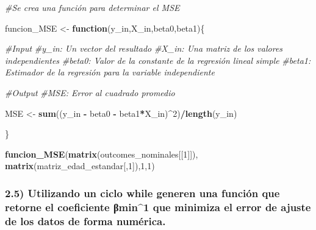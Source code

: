 \documentclass[
]{article}
\newenvironment{Shaded}{\begin{snugshade}}{\end{snugshade}}
\newcommand{\CommentTok}[1]{\textcolor[rgb]{0.56,0.35,0.01}{\textit{#1}}}
\newcommand{\ControlFlowTok}[1]{\textcolor[rgb]{0.13,0.29,0.53}{\textbf{#1}}}
\newcommand{\DecValTok}[1]{\textcolor[rgb]{0.00,0.00,0.81}{#1}}
\newcommand{\FunctionTok}[1]{\textcolor[rgb]{0.13,0.29,0.53}{\textbf{#1}}}
\newcommand{\NormalTok}[1]{#1}
\newcommand{\OtherTok}[1]{\textcolor[rgb]{0.56,0.35,0.01}{#1}}
\newcommand{\SpecialCharTok}[1]{\textcolor[rgb]{0.81,0.36,0.00}{\textbf{#1}}}
\begin{document}
\begin{Shaded}
\begin{Highlighting}[]
\CommentTok{\#Se crea una función para determinar el MSE}

\NormalTok{funcion\_MSE }\OtherTok{\textless{}{-}} \ControlFlowTok{function}\NormalTok{(y\_in,X\_in,beta0,beta1)\{}
  
  \CommentTok{\#Input}
    \CommentTok{\#y\_in: Un vector del resultado}
    \CommentTok{\#X\_in: Una matriz de los valores independientes}
    \CommentTok{\#beta0: Valor de la constante de la regresión lineal simple}
    \CommentTok{\#beta1: Estimador de la regresión para la variable independiente}
  
  \CommentTok{\#Output}
    \CommentTok{\#MSE: Error al cuadrado promedio}
  
\NormalTok{  MSE }\OtherTok{\textless{}{-}} \FunctionTok{sum}\NormalTok{((y\_in }\SpecialCharTok{{-}}\NormalTok{ beta0 }\SpecialCharTok{{-}}\NormalTok{ beta1}\SpecialCharTok{*}\NormalTok{X\_in)}\SpecialCharTok{\^{}}\DecValTok{2}\NormalTok{)}\SpecialCharTok{/}\FunctionTok{length}\NormalTok{(y\_in)}
  
  
  
\NormalTok{\}}

\FunctionTok{funcion\_MSE}\NormalTok{(}\FunctionTok{matrix}\NormalTok{(outcomes\_nominales[[}\DecValTok{1}\NormalTok{]]),}
            \FunctionTok{matrix}\NormalTok{(matriz\_edad\_estandar[,}\DecValTok{1}\NormalTok{]),}\DecValTok{1}\NormalTok{,}\DecValTok{1}\NormalTok{)}
\end{Highlighting}
\end{Shaded}

\hypertarget{utilizando-un-ciclo-while-generen-una-funciuxf3n-que-retorne-el-coeficiente-ux3b2min1-que-minimiza-el-error-de-ajuste-de-los-datos-de-forma-numuxe9rica.}{%
\subsubsection{2.5) Utilizando un ciclo while generen una función que
retorne el coeficiente βmin\^{}1 que minimiza el error de ajuste de los
datos de forma
numérica.}\label{utilizando-un-ciclo-while-generen-una-funciuxf3n-que-retorne-el-coeficiente-ux3b2min1-que-minimiza-el-error-de-ajuste-de-los-datos-de-forma-numuxe9rica.}}
\end{document}
